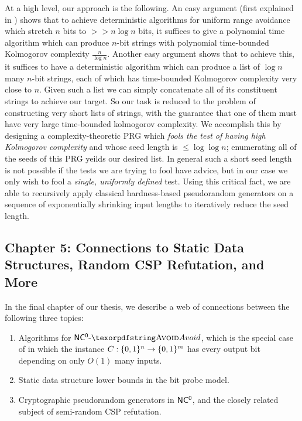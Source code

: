 At a high level, our approach is the following. An easy argument (first explained in \cite{RSW}) shows that to achieve deterministic algorithms for uniform range avoidance which stretch $n$ bits to $>> n \log n$ bits, it suffices to give a polynomial time algorithm which can produce $n$-bit strings with polynomial time-bounded Kolmogorov complexity $\frac{n}{\log n}$. Another easy argument shows that to achieve this, it suffices to have a deterministic algorithm which can produce a list of $\log n$ many $n$-bit strings, each of which has time-bounded Kolmogorov complexity very close to $n$. Given such a list we can simply concatenate all of its constituent strings to achieve our target. So our task is reduced to the problem of constructing very short lists of strings, with the guarantee that one of them must have very large time-bounded kolmogorov complexity. We accomplish this by designing a complexity-theoretic PRG which \emph{fools the test of having high Kolmogorov complexity} and whose seed length is $ \leq \log \log n$; enumerating all of the seeds of this PRG yeilds our desired list. In general such a short seed length is not possible if the tests we are trying to fool have advice, but in our case we only wish to fool a \emph{single, uniformly defined} test. Using this critical fact, we are able to recursively apply classical hardness-based pseudorandom generators \cite{NW,IW97,umans} on a sequence of exponentially shrinking input lengths to iteratively reduce the seed length.

\subsection{Chapter 5: Connections to Static Data Structures, Random CSP Refutation, and More}

In the final chapter of our thesis, we describe a web of connections between the following three topics:
\begin{enumerate}
    \item Algorithms for $\cl{NC^0}\dash \avoid$, which is the special case of \avoid in which the instance $C: \{0,1\}^n \to \{0,1\}^m$ has every output bit depending on only $O(1)$ many inputs. 
    \item Static data structure lower bounds in the bit probe model.
    \item Cryptographic pseudorandom generators in $\cl{NC^0}$, and the closely related subject of semi-random CSP refutation.
\end{enumerate}
